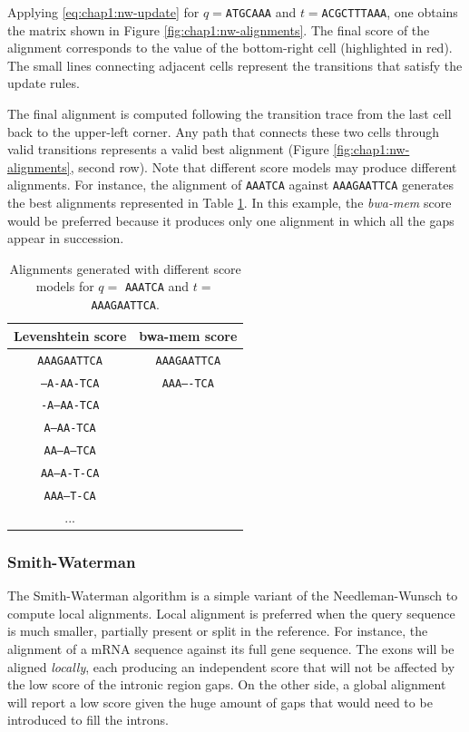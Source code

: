 Applying \eqref{eq:chap1:nw-update} for $q=$\texttt{ATGCAAA} and
$t=$\texttt{ACGCTTTAAA}, one obtains the matrix shown in Figure
\ref{fig:chap1:nw-alignments}. The final score of the alignment corresponds
to the value of the bottom-right cell (highlighted in red). The small
lines connecting adjacent cells represent the transitions that satisfy
the update rules.

The final alignment is computed following the transition trace from the
last cell back to the upper-left corner. Any path that connects these
two cells through valid transitions represents a valid best alignment
(Figure \ref{fig:chap1:nw-alignments}, second row). Note that
different score  models may produce different alignments. For
instance, the alignment of \texttt{AAATCA} against \texttt{AAAGAATTCA}
generates the best alignments represented in Table
\ref{tab:chap1:alignment-gaps}. In this example, the {\em bwa-mem}
score would be preferred because it produces only one alignment in
which all the gaps appear in succession.

\begin{table}[h]
\centering
\caption{Alignments generated with different score
  models for $q=$ \texttt{AAATCA} and $t=$ \texttt{AAAGAATTCA}.}
\begin{tabular}{|c|c|}
   \hline
   {\bf Levenshtein score} & {\bf bwa-mem score}\\
   \hline
   \texttt{AAAGAATTCA} & \texttt{AAAGAATTCA}\\
   \hline
	\texttt{--A-AA-TCA} & \texttt{AAA----TCA}\\
	\texttt{-A--AA-TCA} & \\
	\texttt{A---AA-TCA} & \\
	\texttt{AA--A--TCA} & \\
	\texttt{AA--A-T-CA} & \\
	\texttt{AAA---T-CA} & \\
	... & \\
   \hline
\end{tabular}
\label{tab:chap1:alignment-gaps}
\end{table}

\subsubsection{Smith-Waterman}
\label{sec:chap1:align-sw}
The Smith-Waterman algorithm is a simple variant of the
Needleman-Wunsch to compute local alignments. Local alignment is
preferred when the query sequence is much smaller, partially present
or split in the reference. For instance, the alignment of a mRNA
sequence against its full gene sequence. The exons will be aligned
{\em   locally}, each producing an independent score that will not be
affected by the low score of the intronic region gaps. On the other
side, a global alignment will report a low score given the huge amount
of gaps that would need to be introduced to fill the introns.

